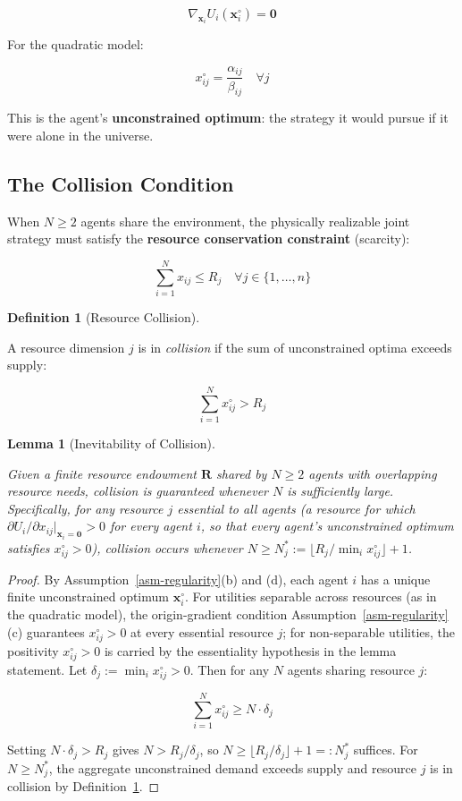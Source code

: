 \documentclass[11pt]{article}
\theoremstyle{plain}
\newtheorem{lemma}[theorem]{Lemma}
\theoremstyle{definition}
\newtheorem{definition}{Definition}
\theoremstyle{remark}
\let\origsubsection\subsection
\renewcommand{\subsection}{\needspace{7\baselineskip}\origsubsection}
\begin{document}
\[\nabla_{\mathbf{x}_i} U_i(\mathbf{x}_i^{\circ}) = \mathbf{0}\]

For the quadratic model:

\[x_{ij}^{\circ} = \frac{\alpha_{ij}}{\beta_{ij}} \quad \forall j\]

This is the agent's \textbf{unconstrained optimum}: the strategy it
would pursue if it were alone in the universe.

\subsection{The Collision Condition}\label{the-collision-condition}

When \(N \geq 2\) agents share the environment, the physically
realizable joint strategy must satisfy the \textbf{resource conservation
constraint} (scarcity):

\[\sum_{i=1}^{N} x_{ij} \leq R_j \quad \forall j \in \{1, \ldots, n\}\]

\begin{definition}[Resource Collision]
\label{def-resource-collision}

A resource dimension $j$ is in \emph{collision} if the sum of unconstrained optima exceeds supply:

$$\sum_{i=1}^{N} x_{ij}^{\circ} > R_j$$
\end{definition}

\begin{lemma}[Inevitability of Collision]
\label{lem-inevitability-collision}

Given a finite resource endowment $\mathbf{R}$ shared by $N \geq 2$ agents with overlapping resource needs, collision is guaranteed whenever $N$ is sufficiently large. Specifically, for any resource $j$ \emph{essential} to all agents (a resource for which $\partial U_i / \partial x_{ij} |_{\mathbf{x}_i = \mathbf{0}} > 0$ for every agent $i$, so that every agent's unconstrained optimum satisfies $x_{ij}^{\circ} > 0$), collision occurs whenever $N \geq N_j^* := \lfloor R_j / \min_i x_{ij}^{\circ} \rfloor + 1$.
\end{lemma}

\begin{proof}
By Assumption~\ref{asm-regularity}(b) and (d), each agent $i$ has a unique finite unconstrained optimum $\mathbf{x}_i^{\circ}$. For utilities separable across resources (as in the quadratic model), the origin-gradient condition Assumption~\ref{asm-regularity}(c) guarantees $x_{ij}^{\circ} > 0$ at every essential resource $j$; for non-separable utilities, the positivity $x_{ij}^{\circ} > 0$ is carried by the essentiality hypothesis in the lemma statement. Let $\delta_j := \min_{i} x_{ij}^{\circ} > 0$. Then for any $N$ agents sharing resource $j$:

$$\sum_{i=1}^{N} x_{ij}^{\circ} \geq N \cdot \delta_j$$

Setting $N \cdot \delta_j > R_j$ gives $N > R_j / \delta_j$, so $N \geq \lfloor R_j / \delta_j \rfloor + 1 =: N_j^*$ suffices. For $N \geq N_j^*$, the aggregate unconstrained demand exceeds supply and resource $j$ is in collision by Definition~\ref{def-resource-collision}.
\end{proof}
\end{document}
